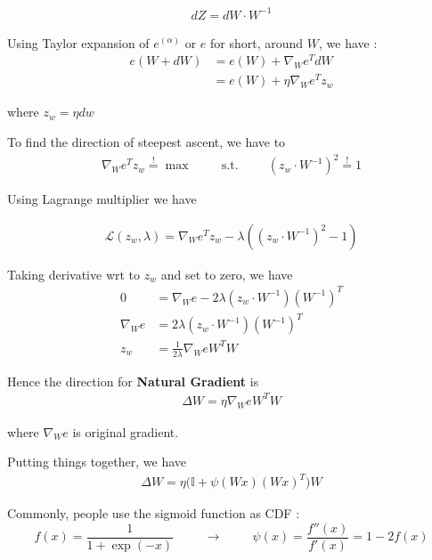 \begin{align*}
	dZ = dW \cdot W^{-1}
\end{align*}

Using Taylor expansion of $e^{(\alpha)}$ or $e$ for short, around $W$,  we have :
\begin{align*}
	e( W + dW ) &= e(W) + \nabla_{W} e^T dW  \\
	&=  e(W) + \eta \nabla_{W} e^T z_w
\end{align*}

where $z_w = \eta dw$

To find the direction of steepest ascent, we have to 
\begin{align*}
		 \nabla_{W} e^T z_w \stackrel{!}{=} \max \hspace{1cm} \text{s.t.} \hspace{1cm} (z_w \cdot  W^{-1} )^2 \stackrel{!}{=} 1
\end{align*}

Using Lagrange multiplier we have 

\begin{align*}
	\mathcal{L}(z_w, \lambda)  =  \nabla_{W} e^T z_w - \lambda ( (z_w \cdot  W^{-1} )^2 - 1 )
\end{align*}

Taking derivative wrt to $z_w$ and set to zero, we have 
\begin{align*}
  0 &= \nabla_{W} e - 2\lambda ( z_w \cdot W^{-1} )(W^{-1})^T \\
    \nabla_{W} e &= 2\lambda ( z_w \cdot W^{-1} )(W^{-1})^T \\
    z_w &= \frac{1}{2\lambda} \nabla_{W} e W^T W
\end{align*} 

Hence the direction for \textbf{Natural Gradient} is 
\begin{align*}
	\Delta W = \eta \nabla_{W} e W^T W
\end{align*}

where $\nabla_{W} e$ is original gradient. 

Putting things together, we have 
\begin{align*}
	\Delta W = \eta \Bigg (  \mathbb{I} + \psi(Wx) (Wx)^T \Bigg) W	
\end{align*} 

Commonly, people use the sigmoid function as CDF : 
$$
f(x) = \frac{1}{1+\exp(-x)}  \hspace{1cm} \rightarrow \hspace{1cm}  \psi(x) = \frac{f''(x)}{f'(x)} = 1 - 2f(x)
$$


